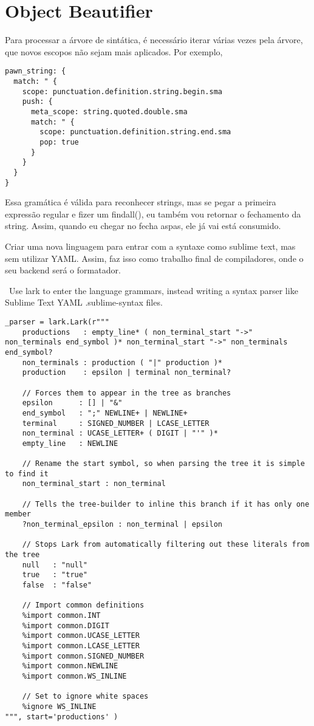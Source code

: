 

\chapter{Object Beautifier}\label{sec:software_implementation}

Para processar a árvore de sintática, é necessário iterar várias vezes pela árvore, que novos escopos não sejam mais aplicados.
Por exemplo,
\begin{lstlisting}
pawn_string: {
  match: " {
    scope: punctuation.definition.string.begin.sma
    push: {
      meta_scope: string.quoted.double.sma
      match: " {
        scope: punctuation.definition.string.end.sma
        pop: true
      }
    }
  }
}
\end{lstlisting}
Essa gramática é válida para reconhecer strings, mas se pegar a primeira expressão
regular e fizer um findall(), eu também vou retornar o fechamento da string.
Assim, quando eu chegar no fecha aspas, ele já vai está consumido.

Criar uma nova linguagem para entrar com a syntaxe como sublime text, mas sem utilizar YAML.
Assim, faz isso como trabalho final de compiladores, onde o seu backend será o formatador.

~Use lark to enter the language grammars, instead writing a syntax parser like Sublime Text YAML .sublime-syntax files.~
\begin{lstlisting}
_parser = lark.Lark(r"""
    productions   : empty_line* ( non_terminal_start "->" non_terminals end_symbol )* non_terminal_start "->" non_terminals end_symbol?
    non_terminals : production ( "|" production )*
    production    : epsilon | terminal non_terminal?

    // Forces them to appear in the tree as branches
    epsilon      : [] | "&"
    end_symbol   : ";" NEWLINE+ | NEWLINE+
    terminal     : SIGNED_NUMBER | LCASE_LETTER
    non_terminal : UCASE_LETTER+ ( DIGIT | "'" )*
    empty_line   : NEWLINE

    // Rename the start symbol, so when parsing the tree it is simple to find it
    non_terminal_start : non_terminal

    // Tells the tree-builder to inline this branch if it has only one member
    ?non_terminal_epsilon : non_terminal | epsilon

    // Stops Lark from automatically filtering out these literals from the tree
    null   : "null"
    true   : "true"
    false  : "false"

    // Import common definitions
    %import common.INT
    %import common.DIGIT
    %import common.UCASE_LETTER
    %import common.LCASE_LETTER
    %import common.SIGNED_NUMBER
    %import common.NEWLINE
    %import common.WS_INLINE

    // Set to ignore white spaces
    %ignore WS_INLINE
""", start='productions' )
\end{lstlisting}



